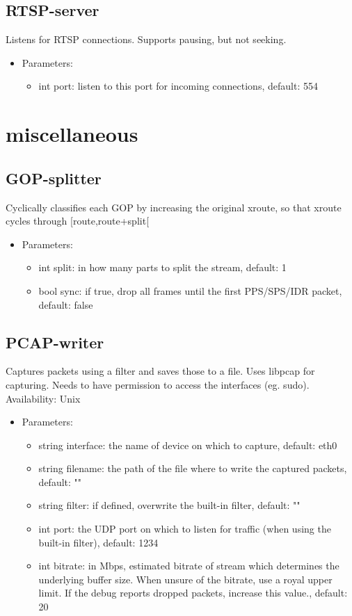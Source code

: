 \subsection{RTSP-server}
Listens for RTSP connections. Supports pausing, but not seeking.
\begin{itemize}
\item Parameters:
\begin{itemize}
\item int port: listen to this port for incoming connections, default: 554
\end{itemize}
\end{itemize}
\newpage
\section{miscellaneous}

\subsection{GOP-splitter}
Cyclically classifies each GOP by increasing the original xroute, so that xroute cycles through [route,route+split[
\begin{itemize}
\item Parameters:
\begin{itemize}
\item int split: in how many parts to split the stream, default: 1
\item bool sync: if true, drop all frames until the first PPS/SPS/IDR packet, default: false
\end{itemize}
\end{itemize}
\subsection{PCAP-writer}
Captures packets using a filter and saves those to a file. Uses libpcap for capturing. Needs to have permission to access the interfaces (eg. sudo).
\newline Availability: Unix\begin{itemize}
\item Parameters:
\begin{itemize}
\item string interface: the name of device on which to capture, default: eth0
\item string filename: the path of the file where to write the captured packets, default: ""
\item string filter: if defined, overwrite the built-in filter, default: ""
\item int port: the UDP port on which to listen for traffic (when using the built-in filter), default: 1234
\item int bitrate: in Mbps, estimated bitrate of stream which determines the underlying buffer size. When unsure of the bitrate, use a royal upper limit. If the debug reports dropped packets, increase this value., default: 20
\end{itemize}
\end{itemize}

